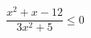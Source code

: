 \begin{ex}[type=inequality]
	\begin{condition}
		\( \dfrac{x^2+x-12}{3x^2+5}\le0 \)
	\end{condition}
\end{ex}